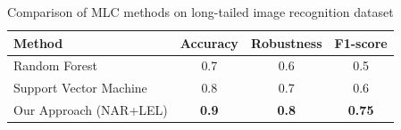\documentclass{article}
\begin{document}
\begin{table}[!ht]
\centering
\caption{Comparison of MLC methods on long-tailed image recognition dataset}
\begin{tabular}{|l|c|c|c|}
\hline
Method & Accuracy & Robustness & F1-score \\
\hline
Random Forest & 0.7 & 0.6 & 0.5 \\
\hline
Support Vector Machine & 0.8 & 0.7 & 0.6 \\
\hline
Our Approach (NAR+LEL) & \textbf{0.9} & \textbf{0.8} & \textbf{0.75} \\
\hline
\end{tabular}
\end{table}
\end{document}
